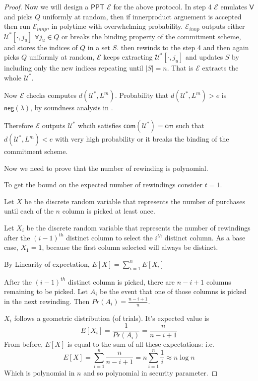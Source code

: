 \documentclass[runningheads]{llncs}
\newcommand{\pnote}[1] {\textcolor{red}  {PKP: \sl{#1}}}
\def\ppt{\mathsf{PPT}}
\def\extrac{\mathcal{E}} %
\def\verifier{\mathsf{V}}
\def\RS{\mathsf{RS}} %
\def\cm{\mathsf{cm}} %
\def\com{\mathsf{com}} %
\def\negl{\mathsf{neg}}
\def\oracle{\mathcal{U}^{\RS}}
\def\calU{\mathcal{U}}
\begin{document}
	\begin{proof}
		Now we will design a $\ppt$ $\extrac$ for the above protocol.
		In step 4 $\extrac$ emulates $\verifier$ and picks $Q$ uniformly at random, then if innerproduct arguement is accepted then run $\extrac_{innp}$, in polytime with overwhelming probability. $\extrac_{innp}$ outputs either $\calU^*[\cdot,j_u]$ $\forall j_u\in Q$ or breaks the binding property of the commitment scheme, and stores the indices of $Q$ in a set $S$. then rewinds to the step 4 and then again picks $Q$ uniformly at random, $\extrac$ keeps extracting $\calU^*[\cdot,j_u]$ and updates $S$ by including only the new indices repeating until $|S|=n$. That is $\extrac$ extracts the whole $\calU^*$.
		\begin{comment}
		In the next step $\extrac$ gets $\calU^*[\cdot,j_u]$ $\forall j_u \in S$. Since $|S|>k$, from $\oracle_x[\cdot,j_u]$ decoding is deterministic, so the $\extrac$ decodes $\oracle$ to $x$ and outputs $x$.
		\end{comment}
		
		Now $\extrac$ checks computes $d(\calU^*, L^m)$. Probability that $d(\calU^*,L^m) > e$ is $\negl(\lambda)$, by soundness analysis in \cite{Ligero2017}.
		
		Therefore $\extrac$ outputs $\calU^*$ whcih satisfies $\com(\calU^*) = \cm$ such that $d(\calU^*, L^m) < e$ with very high probability or it breaks the binding of the commitment scheme.
		
		Now we need to prove that the number of rewinding is polynomial.
		
		To get the bound on the expected number of rewindings consider $t=1$. 
		
		Let $X$ be the discrete random variable that represents the number of purchases until each of the $n$ column is picked at least once.
		
		Let $X_i$ be the discrete random variable that represents the number of rewindings after the $(i-1)^{th}$ distinct column to select the $i^{th}$ distinct column. As a base case, $X_1=1$, because the first column selected will always be distinct.
		
		By Linearity of expectation, $E[X]=\sum_{i=1}^{n}E[X_i]$
		
		After the $(i-1)^{th}$ distinct column is picked, there are $n-i+1$ columns remaining to be picked. Let $A_i$ be the event that one of those columns is picked in the next rewinding. Then $Pr(A_i)=\frac{n-i+1}{n}$.
		
		$X_i$ follows a geometric distribution (of trials). It's expected value is
		 $$E[X_i]= \frac{1}{Pr(A_i)} = \frac{n}{n-i+1}$$
		From before, $E[X]$ is equal to the sum of all these expectations: i.e.
		$$E[X] = \sum\limits_{i=1}^{n} \frac{n}{n-i+1} = n\sum\limits_{i=1}^{n} \frac{1}{i} \approx n \log n$$
		Which is polynomial in $n$ and so polynomial in security parameter.
	\end{proof}
	
\end{document}
